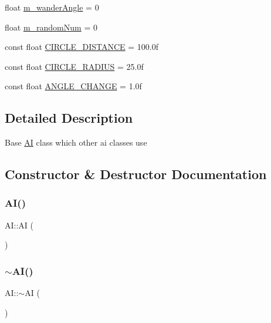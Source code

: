 \begin{DoxyCompactItemize}
\item 
float \mbox{\hyperlink{class_a_i_a84e42b4f0762bb1e7777edca276856ea}{m\+\_\+wander\+Angle}} = 0
\item 
float \mbox{\hyperlink{class_a_i_a3be3fedd8ea354c0c24600453b0b6d44}{m\+\_\+random\+Num}} = 0
\item 
const float \mbox{\hyperlink{class_a_i_ab5f7c13e87603201e56621a94175bcda}{C\+I\+R\+C\+L\+E\+\_\+\+D\+I\+S\+T\+A\+N\+CE}} = 100.\+0f
\item 
const float \mbox{\hyperlink{class_a_i_a6e0782290618efecd32afee880be15b2}{C\+I\+R\+C\+L\+E\+\_\+\+R\+A\+D\+I\+US}} = 25.\+0f
\item 
const float \mbox{\hyperlink{class_a_i_a2f93f21e5247247935f9375c56d2ea5e}{A\+N\+G\+L\+E\+\_\+\+C\+H\+A\+N\+GE}} = 1.\+0f
\end{DoxyCompactItemize}


\subsection{Detailed Description}
Base \mbox{\hyperlink{class_a_i}{AI}} class which other ai classes use 

\subsection{Constructor \& Destructor Documentation}
\mbox{\label{class_a_i_a64ec60281e9eb8496f16525615db54b7}} 
\subsubsection{\texorpdfstring{AI()}{AI()}}
{\footnotesize\ttfamily A\+I\+::\+AI (\begin{DoxyParamCaption}{ }\end{DoxyParamCaption})}

\mbox{\label{class_a_i_a66a8645f0c27285cd75346f2c2bbfb14}} 
\subsubsection{\texorpdfstring{$\sim$AI()}{~AI()}}
{\footnotesize\ttfamily A\+I\+::$\sim$\+AI (\begin{DoxyParamCaption}{ }\end{DoxyParamCaption})}



